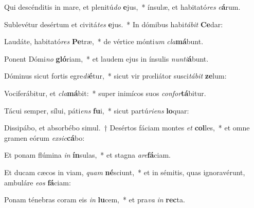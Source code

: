 \item Qui descénditis in mare, et plenitú\textit{do} \textbf{e}jus,~* ínsulæ, et habitató\textit{res} \textit{e}\textbf{á}rum.
\item Sublevétur desértum et civitá\textit{tes} \textbf{e}jus.~* In dómibus habi\textit{tá}\textit{bit} \textbf{Ce}dar:
\item Laudáte, habitató\textit{res} \textbf{Pe}træ,~* de vértice mónti\textit{um} \textit{cla}\textbf{má}bunt.
\item Ponent Dómi\textit{no} \textbf{gló}riam,~* et laudem ejus in ínsulis \textit{nun}\textit{ti}\textbf{á}bunt.
\item Dóminus sicut fortis egre\textit{di}\textbf{é}tur,~* sicut vir prœliátor susci\textit{tá}\textit{bit} \textbf{ze}lum:
\item Vociferábitur, et \textit{cla}\textbf{má}bit:~* super inimícos suos \textit{con}\textit{for}\textbf{tá}bitur.
\item Tácui semper, sílui, páti\textit{ens} \textbf{fu}i,~* sicut partú\textit{ri}\textit{ens} \textbf{lo}quar:
\item Dissipábo, et absorbébo simul.~† Desértos fáciam montes \textit{et} \textbf{col}les,~* et omne gramen eórum \textit{ex}\textit{sic}\textbf{cá}bo:
\item Et ponam flúmina \textit{in} \textbf{ín}sulas,~* et stagna \textit{a}\textit{re}\textbf{fá}ciam.
\item Et ducam cæcos in viam, \textit{quam} \textbf{né}sciunt,~* et in sémitis, quas ignoravérunt, ambuláre \textit{e}\textit{os} \textbf{fá}ciam:
\item Ponam ténebras coram eis \textit{in} \textbf{lu}cem,~* et pra\textit{va} \textit{in} \textbf{rec}ta.

